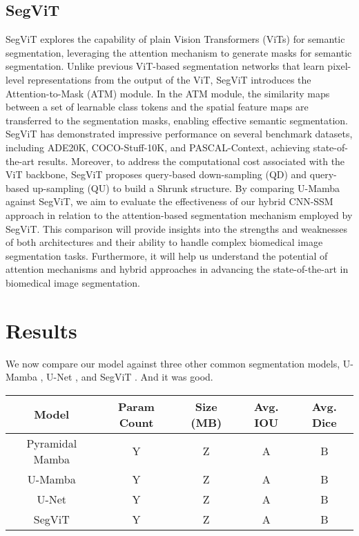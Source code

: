 \documentclass[conference]{IEEEtran}
\begin{document}
\subsection{SegViT}
SegViT \cite{zhang2022segvit} explores the capability of plain Vision Transformers (ViTs) \cite{dosovitskiy2021image} for semantic segmentation, leveraging the attention mechanism to generate masks for semantic segmentation. Unlike previous ViT-based segmentation networks that learn pixel-level representations from the output of the ViT, SegViT introduces the Attention-to-Mask (ATM) module. In the ATM module, the similarity maps between a set of learnable class tokens and the spatial feature maps are transferred to the segmentation masks, enabling effective semantic segmentation.
SegViT has demonstrated impressive performance on several benchmark datasets, including ADE20K, COCO-Stuff-10K, and PASCAL-Context, achieving state-of-the-art results. Moreover, to address the computational cost associated with the ViT backbone, SegViT proposes query-based down-sampling (QD) and query-based up-sampling (QU) to build a Shrunk structure. By comparing U-Mamba against SegViT, we aim to evaluate the effectiveness of our hybrid CNN-SSM approach in relation to the attention-based segmentation mechanism employed by SegViT. This comparison will provide insights into the strengths and weaknesses of both architectures and their ability to handle complex biomedical image segmentation tasks. Furthermore, it will help us understand the potential of attention mechanisms and hybrid approaches in advancing the state-of-the-art in biomedical image segmentation.

\section{Results}
We now compare our model against three other common segmentation models, U-Mamba \cite{}, U-Net \cite{}, and SegViT \cite{}. And it was good.

\centering
\begin{tabular}{|c|c|c|c|c|}
\hline
Model & Param Count & Size (MB) & Avg. IOU & Avg. Dice \\
\hline
Pyramidal Mamba & Y & Z & A & B \\
\hline
U-Mamba & Y & Z & A & B \\
\hline
U-Net & Y & Z & A & B \\
\hline
SegViT & Y & Z & A & B \\
\hline
\end{tabular}
\end{document}
